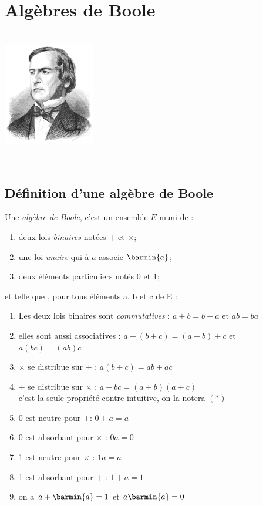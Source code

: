 \documentclass[a4paper,12pt,french]{book}
\begin{document}
	\chapter{Algèbres de Boole}
	\begin{center}
		\ \\[-4em]	\includegraphics[width=4cm]{boole.jpg}
	\end{center}\ \\[-4em]
	\section{Définition d'une algèbre de Boole}

	\begin{definition}[]
		Une \textit{algèbre de Boole}, c'est un ensemble $E$ muni de :
		\begin{enumerate}[\textbullet]
			\item 	deux lois \textit{binaires} notées + et $\times$;
			\item 	une loi \textit{unaire} qui à $a$ associe $\barmin{a}$;
			\item 	deux éléments particuliers notés 0 et 1;
		\end{enumerate}
		et telle que , pour tous éléments a, b et c de E :
		\begin{enumerate}[\textbullet]
			\item 	Les deux lois binaires sont \textit{commutatives} :
					$a+b=b+a$ et $ab=ba$
			\item 	elles sont aussi associatives :
					$a+(b+c)=(a+b)+c$ et $a(bc)=(ab)c$
			\item 	$\times$ se distribue sur + :
								$a(b+c)=ab+ac$
			\item 	+ se distribue sur $\times$ :
					$\boxed{a+bc=(a+b)(a+c)}$  \\
                    c'est la seule propriété contre-intuitive, on la notera $(*)$
			\item 	0 est neutre pour +: $0+a = a$
			\item 	0 est absorbant pour $\times$ : $0a=0$
			\item 	1 est neutre pour $\times$ : $1a=a$
			\item 	1 est absorbant pour + : $1+a=1$
			\item 	on a $a+\barmin{a}=1$ et $a\barmin{a}=0$
		\end{enumerate}
		\end{definition}
\end{document}
